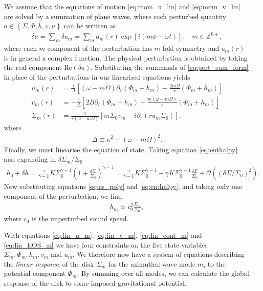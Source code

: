 We assume that the equations of motion \ref{eq:mom_u_lin} and \ref{eq:mom_v_lin} are solved by a summation of plane waves, where each perturbed quantity $a \in \left\{ \Sigma, \Phi, h, v, u \right\}$ can be written as
\begin{align}
    \delta a = \sum_m \delta a_m = \sum_m a_m(r) \exp \left[ i (m\phi - \omega t) \right]; \quad m \in \mathbb{Z}^{0+}, \label{eq:pert_sum_form}
\end{align}
where each $m$ component of the perturbation has $m$-fold symmetry and $a_m(r)$ is in general a complex function.
The physical perturbation is obtained by taking the real component $\mathrm{Re}(\delta a)$.
Substituting the summands of \ref{eq:pert_sum_form} in place of the perturbations in our linearised equations yields
\begin{align}
    u_m (r) &= \frac{i}{\Delta} \left[ (\omega - m \Omega) \partial_r (\Phi_m + h_m) - \frac{2 m \Omega}{r} (\Phi_m + h_m) \right] \label{eq:lin_u_m} \\
    v_m (r) &= - \frac{1}{\Delta} \left[ 2B \partial_r (\Phi_m + h_m) + \frac{m(\omega - m \Omega)}{r} (\Phi_m + h_m) \right] \label{eq:lin_v_m} \\
    \Sigma_m (r) &= \frac{1}{r(\omega - m \Omega)} \left[ m \Sigma_0 v_m -i \partial_r (r u_m \Sigma_0) \right] \label{eq:lin_cont_m},
\end{align}
where
\begin{align}
    \Delta \equiv \kappa^2 - (\omega - m \Omega)^2.
\end{align}
Finally, we must linearise the equation of state.
Taking equation \ref{eq:enthalpy} and expanding in $\delta \Sigma_m / \Sigma_0$
\begin{align}
    h_0 + \delta h = \frac{\gamma}{\gamma - 1} K \Sigma_0^{\gamma - 1}(1 + \frac{\delta\Sigma}{\Sigma_0})^{\gamma-1} = \frac{\gamma}{\gamma - 1} K \Sigma_0^{\gamma - 1} + \gamma K \Sigma_0^{\gamma-1} \frac{\delta\Sigma}{\Sigma_0} + \mathcal{O}(\left(\delta\Sigma / \Sigma_0\right)^2).
\end{align}
Now substituting equations \ref{eq:cs_poly} and \ref{eq:enthalpy}, and taking only one component of the perturbation, we find
\begin{align}
    h_m \simeq c_0^2 \frac{\Sigma_m}{\Sigma_0}, \label{eq:lin_EOS_m}
\end{align}
where $c_0$ is the unperturbed sound speed.

With equations \ref{eq:lin_u_m}, \ref{eq:lin_v_m}, \ref{eq:lin_cont_m} and \ref{eq:lin_EOS_m} we have four constraints on the five state variables $\Sigma_m, \Phi_m, h_m, v_m$ and $u_m$.
We therefore now have a system of equations describing the \textit{linear response} of the disk $\Sigma_m$ for the azimuthal wave mode $m$, to the potential component $\Phi_m$.
By summing over all modes, we can calculate the global response of the disk to some imposed gravitational potential.

